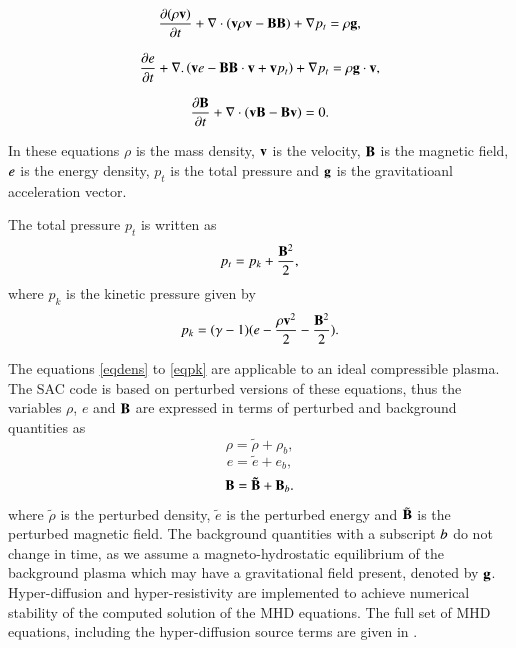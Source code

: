 \documentclass[final,1p]{elsarticle}
\begin{document}
\begin{equation}\label{eqmom}
{{\partial ( \rho {\bf v})}\over{\partial t}}+\nabla\cdot\left( {\bf v}\rho {\bf v}-{\bf B B}\right)+\nabla p_t=\rho{\bf g},
\end{equation}

\begin{equation}\label{eqe}
{{\partial e}\over{\partial t}}+\nabla.\left({\bf v}e-{\bf B B}\cdot{\bf v}+{\bf v}p_{t}\right)+\nabla p_t=\rho{\bf g}\cdot{\bf v},
\end{equation}

\begin{equation}\label{eqb}
{{\partial{\bf B}}\over{\partial t}} +\nabla \cdot\left(  {\bf vB}-{\bf Bv}\right)=0.
\end{equation}

In these equations $\rho$ is the mass density, $  \bf { v} $ is the velocity,   $ \bf B$ is the magnetic field, $\it{e}$ is the energy density, $p_{t}$ is the total pressure and $\bf g$ is the gravitatioanl acceleration vector.

The total pressure $p_{t}$ is written as
\begin{equation}\label{eqpt}
p_{t}=p_{k}+{{\bf B}^{2}\over{2}},
\end{equation}
where $p_k$ is the kinetic pressure given by
\begin{equation}\label{eqpk}
p_{k}=(\gamma - 1)( e-{{\rho \bf v }^{2}\over{2}}-  {{\bf B}^{2}\over{2}} ).
\end{equation}

The equations \eqref{eqdens} to \eqref{eqpk} are applicable to an ideal compressible plasma. The SAC code is based on perturbed versions of these equations, thus the variables $\rho $, $e$ and  $\bf B$ are expressed in terms of perturbed and background quantities as
\begin{equation}
\rho = \tilde{\rho}+\rho _{b},
\end{equation}
\begin{equation}
e = \tilde{e}+e _{b},
\end{equation}
\begin{equation}
\bf B = \tilde{\bf B}+{\bf B}_{\it{b}}.
\end{equation}
where $\tilde{\rho}$ is the  perturbed density,  $\tilde{e}$ is the perturbed energy and $\tilde{\bf B}$  is the perturbed magnetic field. The background quantities with a subscript $\it{b}$ do not change in time, as we assume a magneto-hydrostatic equilibrium of the background plasma which may have a gravitational field present, denoted by $\bf g$. Hyper-diffusion and hyper-resistivity \cite{Caunt2001}
are implemented to achieve numerical stability of the computed solution of the MHD equations.  The full set of MHD equations, including the hyper-diffusion source terms are given in \cite{Griffiths2015}\cite{Shelyag2008}.
\end{document}
